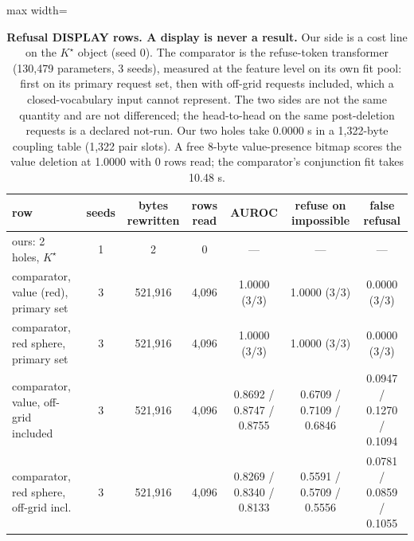 \documentclass{article} %
\newcommand{\Kstar}{\ensuremath{K^{\star}}}
\begin{document}
\begin{table}[t]
\centering\small
\caption{\textbf{Refusal DISPLAY rows. A display is never a result.} Our side is a cost line
on the $\Kstar$ object (seed 0). The comparator is the refuse-token transformer (130,479
parameters, 3 seeds), measured at the feature level on its own fit pool: first on its primary
request set, then with off-grid requests included, which a closed-vocabulary input cannot
represent. The two sides are not the same quantity and are not differenced; the head-to-head on
the same post-deletion requests is a declared not-run. Our two holes take 0.0000 s in a 1,322-byte %
coupling table (1,322 pair slots). A free 8-byte value-presence bitmap scores the value deletion %
at 1.0000 with 0 rows read; the comparator's conjunction fit takes 10.48 s.} %
\label{tab:hole}
\setlength{\tabcolsep}{3pt}
\begin{adjustbox}{max width=\linewidth}\begin{tabular}{lcccccc}
\toprule
row & seeds & bytes rewritten & rows read & AUROC & refuse on impossible & false refusal \\
\midrule
ours: 2 holes, $\Kstar$ & 1 & 2 & 0 & --- & --- & --- \\ %
comparator, value (red), primary set & 3 & 521,916 & 4,096 & 1.0000 (3/3) & 1.0000 (3/3) & 0.0000 (3/3) \\
comparator, red sphere, primary set & 3 & 521,916 & 4,096 & 1.0000 (3/3) & 1.0000 (3/3) & 0.0000 (3/3) \\
comparator, value, off-grid included & 3 & 521,916 & 4,096 & 0.8692 / 0.8747 / 0.8755 & 0.6709 / 0.7109 / 0.6846 & 0.0947 / 0.1270 / 0.1094 \\
comparator, red sphere, off-grid incl. & 3 & 521,916 & 4,096 & 0.8269 / 0.8340 / 0.8133 & 0.5591 / 0.5709 / 0.5556 & 0.0781 / 0.0859 / 0.1055 \\
\bottomrule
\end{tabular}\end{adjustbox}
\end{table}
\end{document}
